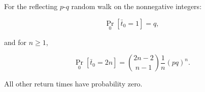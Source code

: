 For the reflecting $p$-$q$ random walk on the nonnegative integers:

$$\Pr_0[\bar{t}_0 = 1] = q,$$

and for $n \geq 1$,

$$\Pr_0[\bar{t}_0 = 2n] = \binom{2n-2}{n-1} \frac{1}{n} (pq)^n.$$

All other return times have probability zero.
